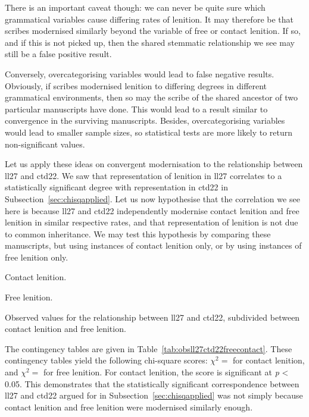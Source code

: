 There is an important caveat though: we can never be quite sure which grammatical variables cause differing rates of lenition. It may therefore be that scribes modernised similarly beyond the variable of free or contact lenition. If so, and if this is not picked up, then the shared stemmatic relationship we see may still be a false positive result.

Conversely, overcategorising variables would lead to false negative results. Obviously, if scribes modernised lenition to differing degrees in different grammatical environments, then so may the scribe of the shared ancestor of two particular manuscripts have done. This would lead to a result similar to convergence in the surviving manuscripts. Besides, overcategorising variables would lead to smaller sample sizes, so statistical tests are more likely to return non-significant values.

Let us apply these ideas on convergent modernisation to the relationship between \gls{ll27} and \gls{ctd22}. We saw that representation of lenition in \gls{ll27} correlates to a statistically significant degree with representation in \gls{ctd22} in Subsection~\ref{sec:chisqapplied}. Let us now hypothesise that the correlation we see here is because \gls{ll27} and \gls{ctd22} independently modernise contact lenition and free lenition in similar respective rates, and that representation of lenition is not due to common inheritance. We may test this hypothesis by comparing these manuscripts, but using instances of contact lenition only, or by using instances of free lenition only. 

\begin{table}[h]
  \begin{subtable}[b]{0.5\linewidth}
    \centering
    
    \caption{Contact lenition.}
    \label{tab:contactlentab}
  \end{subtable}%
  \begin{subtable}[b]{0.5\linewidth}
    \centering
    
    \caption{Free lenition.}
    \label{tab:obsll27ctd22free}
  \end{subtable}
  \caption{Observed values for the relationship between \gls{ll27} and \gls{ctd22}, subdivided between contact lenition and free lenition.}
  \label{tab:obsll27ctd22freecontact}
\end{table}

The contingency tables are given in Table~\ref{tab:obsll27ctd22freecontact}. These contingency tables yield the following chi-square scores: \(\chi^2 = \) for contact lenition, and \(\chi^2 = \) for free lenition. For contact lenition, the score is significant at \emph{p} < 0.05. This demonstrates that the statistically significant correspondence between \gls{ll27} and \gls{ctd22} argued for in Subsection~\ref{sec:chisqapplied} was not simply because contact lenition and free lenition were modernised similarly enough. 

